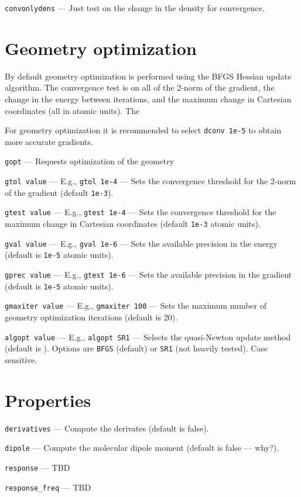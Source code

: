 \documentclass[letterpaper]{book}
\begin{document}
{\tt convonlydens} --- Just test on the change in the density for convergence.


\section{Geometry optimization}

By default geometry optimization is performed using the BFGS Hessian update algorithm.  The convergence test is on all of the 2-norm of the gradient, the change in the energy between iterations, and the maximum change in Cartesian coordinates (all in atomic units).  The 

For geometry optimization it is recommended to select {\tt dconv 1e-5} to obtain more accurate gradients.

{\tt gopt} --- Requests optimization of the geometry

{\tt gtol value} --- E.g., {\tt gtol 1e-4} --- Sets the convergence threshold for the 2-norm of the gradient (default {\tt 1e-3}).

{\tt gtest value} --- E.g., {\tt gtest 1e-4} --- Sets the convergence threshold for the maximum change in Cartesian coordinates (default {\tt 1e-3} atomic units).

{\tt gval value} --- E.g., {\tt gval 1e-6} --- Sets the available precision in the energy (default is {\tt 1e-5} atomic units).

{\tt gprec value} --- E.g., {\tt gtest 1e-6} --- Sets the available precision in the gradient (default is {\tt 1e-5} atomic units).

{\tt gmaxiter value} --- E.g., {\tt gmaxiter 100} --- Sets the maximum number of geometry optimization iterations (default is 20).

{\tt algopt value} --- E.g., {\tt algopt SR1} --- Selects the quasi-Newton update method (default is ).  Options are {\tt BFGS} (default) or {\tt SR1} (not heavily tested).  Case sensitive.

\section{Properties}

{\tt derivatives} --- Compute the derivates (default is false).

{\tt dipole} --- Compute the molecular dipole moment (default is false --- why?).

{\tt response} --- TBD

{\tt response\_freq} ---  TBD
\end{document}

